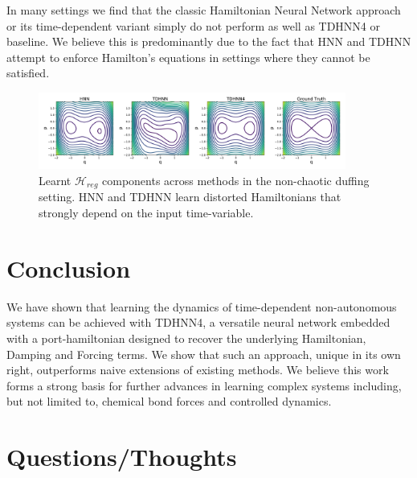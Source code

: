 \documentclass[twoside]{article}
\begin{document}
In many settings we find that the classic Hamiltonian Neural Network approach or its time-dependent variant simply do not perform as well as TDHNN4 or baseline. We believe this is predominantly due to the fact that HNN and TDHNN attempt to enforce Hamilton's equations in settings where they cannot be satisfied.


\begin{figure}[h]
\centering
\includegraphics[width=0.9\textwidth]{figures/duffing_ham_1.pdf}
\caption{Learnt $\mathcal{H}_{reg}$ components across methods in the non-chaotic duffing setting. HNN and TDHNN learn distorted Hamiltonians that strongly depend on the input time-variable.}
\label{duffing_ham}
\end{figure}

\section{Conclusion}

We have shown that learning the dynamics of time-dependent non-autonomous systems can be achieved with TDHNN4, a versatile neural network embedded with a port-hamiltonian designed to recover the underlying Hamiltonian, Damping and Forcing terms. We show that such an approach, unique in its own right, outperforms naive extensions of existing methods. We believe this work forms a strong basis for further advances in learning complex systems including, but not limited to, chemical bond forces and controlled dynamics. 
\section{Questions/Thoughts}

\end{document}
